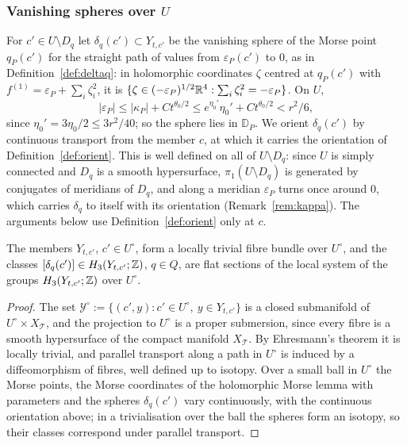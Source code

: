 \subsubsection*{Vanishing spheres over $U$}
For $c'\in U\setminus D_q$ let $\delta_q(c')\subset Y_{t,c'}$ be the vanishing sphere of the Morse point $q_P(c')$ for the
straight path of values from $\varepsilon_P(c')$ to $0$, as in Definition~\ref{def:deltaq}: in holomorphic coordinates
$\zeta$ centred at $q_P(c')$ with $f^{(1)}=\varepsilon_P+\sum_i\zeta_i^2$, it is
$\{\zeta\in(-\varepsilon_P)^{1/2}\mathbb R^4:\sum_i\zeta_i^2=-\varepsilon_P\}$. On $U$,
\begin{equation}\label{eq:epsbound}
|\varepsilon_P|\le|\kappa_P|+Ct^{\theta_0/2}\le e^{\eta_0'}\eta_0'+Ct^{\theta_0/2}<r^2/6,
\end{equation}
since $\eta_0'=3\eta_0/2\le3r^2/40$; so the sphere lies in $\mathbb D_P$. We orient $\delta_q(c')$ by continuous
transport from the member $c$, at which it carries the orientation of Definition~\ref{def:orient}. This is well defined
on all of $U\setminus D_q$: since $U$ is simply connected and $D_q$ is a smooth hypersurface, $\pi_1(U\setminus D_q)$ is
generated by conjugates of meridians of $D_q$, and along a meridian $\varepsilon_P$ turns once around $0$, which carries
$\delta_q$ to itself with its orientation (Remark~\ref{rem:kappa}). The arguments below use Definition~\ref{def:orient}
only at $c$.

\begin{lemma}[flatness]\label{lem:flat}
The members $Y_{t,c'}$, $c'\in U^\circ$, form a locally trivial fibre bundle over $U^\circ$, and the classes
$[\delta_q(c')]\in H_3(Y_{t,c'};\mathbb Z)$, $q\in Q$, are flat sections of the local system of the groups
$H_3(Y_{t,c'};\mathbb Z)$ over $U^\circ$.
\end{lemma}

\begin{proof}
The set $\mathcal Y^\circ:=\{(c',y):c'\in U^\circ,\ y\in Y_{t,c'}\}$ is a closed submanifold of $U^\circ\times X_{\mathcal T}$,
and the projection to $U^\circ$ is a proper submersion, since every fibre is a smooth hypersurface of the compact
manifold $X_{\mathcal T}$. By Ehresmann's theorem it is locally trivial, and parallel transport along a path in $U^\circ$
is induced by a diffeomorphism of fibres, well defined up to isotopy. Over a small ball in $U^\circ$ the Morse points,
the Morse coordinates of the holomorphic Morse lemma with parameters \cite[\S\S6.2, 9.6]{AGZV1} and the spheres $\delta_q(c')$ vary
continuously, with the continuous orientation above; in a trivialisation over the ball the spheres form an isotopy, so
their classes correspond under parallel transport.
\end{proof}

